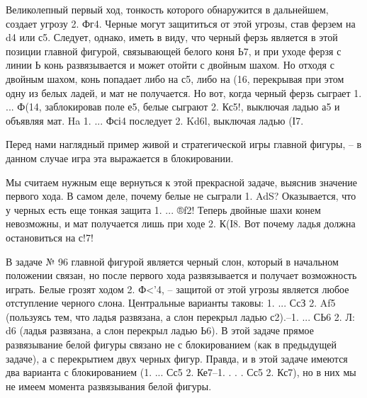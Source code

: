 Великолепный первый ход, тонкость которого обнаружится в дальнейшем, создает угрозу 2. Фг4. Черные могут защититься от этой угрозы, став ферзем на d4 или с5. Следует, однако, иметь в виду, что черный ферзь является в этой позиции главной фигурой, связывающей белого коня Ь7, и при уходе ферзя с линии Ь конь развязывается и может отойти с двойным шахом. Но отходя с двойным шахом, конь попадает либо на с5, либо на (16, перекрывая при этом одну из белых ладей, и мат не получается. Но вот, когда черный ферзь сыграет 1. ... Ф(14, заблокировав поле е5, белые сыграют 2. Кс5!, выключая ладью а5 и объявляя мат. Ha 1. ... Фсі4 последует 2. Kd6l, выключая ладью (І7.

Перед нами наглядный пример живой и стратегической игры главной фигуры, -- в данном случае игра эта выражается в блокировании.

Мы считаем нужным еще вернуться к этой прекрасной задаче, выяснив значение первого хода. В самом деле, почему белые не сыграли 1. AdS? Оказывается, что у черных есть еще тонкая защита 1. ... ®f2! Теперь двойные шахи конем невозможны, и мат получается лишь при ходе 2. К(І8. Вот почему ладья должна остановиться на с!7!

В задаче № 96 главной фигурой является черный слон, который в начальном положении связан, но после первого хода развязывается и получает возможность играть. Белые грозят ходом 2. Ф<’4, -- защитой от этой угрозы является любое отступление черного слона. Центральные варианты таковы: 1. ... СсЗ 2. Af5 (пользуясь тем, что ладья развязана, а слон перекрыл ладью с2).--1. ... СЬ6 2. Л: d6 (ладья развязана, а слон перекрыл ладью Ь6). В этой задаче прямое развязывание белой фигуры связано не с блокированием (как в предыдущей задаче), а с перекрытием двух черных фигур. Правда, и в этой задаче имеются два варианта с блокированием (1. ... Сс5 2. Ке7--1. . . . Сс5 2. Кс7), но в них мы не имеем момента развязывания белой фигуры.
 
